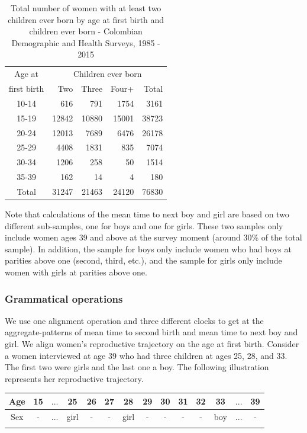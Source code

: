 \documentclass{article}
\begin{document}
\begin{table}[ht]
\centering
\caption{Total number of women with at least two children ever born by age at first birth and children ever born - Colombian Demographic and Health Surveys, 1985 - 2015}
\begin{tabular}{crrrr}
  \hline
Age at  & \multicolumn{4}{c}{Children ever born} \\ 
first birth & Two & Three & Four+ & Total \\ 
  \hline
10-14 & 616 & 791 & 1754 & 3161 \\ 
  15-19 & 12842 & 10880 & 15001 & 38723 \\ 
  20-24 & 12013 & 7689 & 6476 & 26178 \\ 
  25-29 & 4408 & 1831 & 835 & 7074 \\ 
  30-34 & 1206 & 258 & 50 & 1514 \\ 
  35-39 & 162 & 14 & 4 & 180 \\\hline 
  Total & 31247 & 21463 & 24120 & 76830 \\ 
   \hline
\end{tabular}
\label{tfert_01}
\end{table}

Note that calculations of the mean time to next boy and girl are based on two different sub-samples, one for boys and one for girls. These two samples only include women ages 39 and above at the survey moment (around 30\% of the total sample). In addition, the sample for boys only include women who had boys at parities above one (second, third, etc.), and the sample for girls only include women with girls at parities above one. %

\subsubsection{Grammatical operations}

We use one alignment operation and three different clocks to get at the aggregate-patterns of mean time to second birth and mean time to next boy and girl. We align women's reproductive trajectory on the age at first birth. Consider a women interviewed at age 39 who had three children at ages 25, 28, and 33. The first two were girls and the last one a boy. The following illustration represents her reproductive trajectory.\\

\begin{center}
\begin{tabular}{cccccccccccccc}
\hline
    Age & 15 & $...$ & 25 & 26 & 27 & 28 & 29 & 30 & 31 & 32 & 33 & $...$ & 39 \\\hline
    Sex & - & $...$ & girl & - & - & girl & - & - & - & - & boy & $...$ & - \\\hline\\
\end{tabular}
\end{center}
\end{document}
